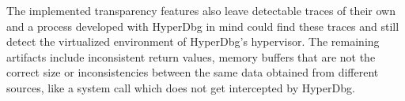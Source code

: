 The implemented transparency features also leave detectable traces of their own and a process developed with HyperDbg in mind could find these 
traces and still detect the virtualized environment of HyperDbg's hypervisor. The remaining artifacts include inconsistent return values, memory buffers 
that are not the correct size or inconsistencies between the same data obtained from different sources, like a system call which does not get intercepted by HyperDbg.



